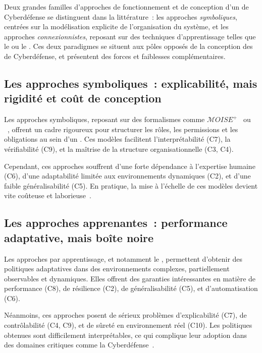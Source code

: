 Deux grandes familles d'approches de fonctionnement et de conception d'un  de Cyberdéfense se distinguent dans la littérature~: les approches \textit{symboliques}, centrées sur la modélisation explicite de l'organisation du système, et les approches \textit{connexionnistes}, reposant sur des techniques d'apprentissage telles que le  ou le . Ces deux paradigmes se situent aux pôles opposés de la conception des  de Cyberdéfense, et présentent des forces et faiblesses complémentaires.

\subsection{Les approches symboliques~: explicabilité, mais rigidité et coût de conception}

Les approches symboliques, reposant sur des formalismes comme $\mathcal{M}OISE^+$~\cite{hubner2002moise} ou ~\cite{Ferber2004}, offrent un cadre rigoureux pour structurer les rôles, les permissions et les obligations au sein d'un . Ces modèles facilitent l'interprétabilité (C7), la vérifiabilité (C9), et la maîtrise de la structure organisationnelle (C3, C4).

Cependant, ces approches souffrent d'une forte dépendance à l'expertise humaine (C6), d'une adaptabilité limitée aux environnements dynamiques (C2), et d'une faible généralisabilité (C5). En pratique, la mise à l'échelle de ces modèles devient vite coûteuse et laborieuse~\cite{Picard2006}.

\subsection{Les approches apprenantes~: performance adaptative, mais boîte noire}

Les approches par apprentissage, et notamment le , permettent d'obtenir des politiques adaptatives dans des environnements complexes, partiellement observables et dynamiques. Elles offrent des garanties intéressantes en matière de performance (C8), de résilience (C2), de généralisabilité (C5), et d'automatisation (C6).

Néanmoins, ces approches posent de sérieux problèmes d'explicabilité (C7), de contrôlabilité (C4, C9), et de sûreté en environnement réel (C10). Les politiques obtenues sont difficilement interprétables, ce qui complique leur adoption dans des domaines critiques comme la Cyberdéfense~\cite{Gunning2019}.

